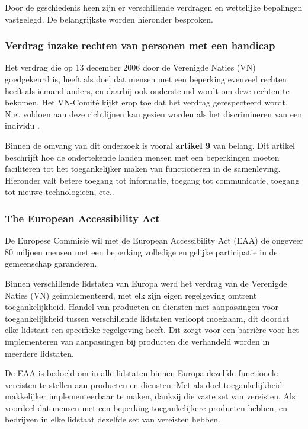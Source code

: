 Door de geschiedenis heen zijn er verschillende verdragen en wettelijke bepalingen vastgelegd. De belangrijkste worden hieronder besproken. 




\subsubsection{Verdrag inzake rechten van personen met een handicap}
Het verdrag die op 13 december 2006 door de Verenigde Naties (VN) goedgekeurd is, heeft als doel dat mensen met een beperking evenveel rechten heeft als iemand anders, en daarbij ook ondersteund wordt om deze rechten te bekomen.  Het VN-Comité kijkt erop toe dat het verdrag gerespecteerd wordt. Niet voldoen aan deze richtlijnen kan gezien worden als het discrimineren van een individu \autocite{unia2006}. 

Binnen de omvang van dit onderzoek is vooral  \textbf{artikel 9} van belang. Dit artikel beschrijft hoe de ondertekende landen mensen met een beperkingen moeten faciliteren tot het toegankelijker maken van functioneren in de samenleving. Hieronder valt betere toegang tot informatie, toegang tot communicatie, toegang tot nieuwe technologieën, etc.. \autocite{un2006}

\subsubsection{The European Accessibility Act}
De Europese Commisie wil met de European Accessibility Act (EAA) de ongeveer 80 miljoen mensen met een beperking volledige en gelijke participatie in de gemeenschap garanderen. 

Binnen verschillende lidstaten van Europa werd het verdrag van de Verenigde Naties (VN) geïmplementeerd, met elk zijn eigen regelgeving omtrent toegankelijkheid.
Handel van producten en diensten met aanpassingen voor toegankelijkheid tussen verschillende lidstaten verloopt moeizaam, dit doordat elke lidstaat een specifieke regelgeving heeft.
Dit zorgt voor een barrière voor het implementeren van aanpassingen bij producten die verhandeld worden in meerdere lidstaten.

De EAA is bedoeld om in alle lidstaten binnen Europa dezelfde functionele vereisten te stellen aan producten en diensten. Met als doel toegankelijkheid makkelijker implementeerbaar te maken, dankzij die vaste set van vereisten. 
Als voordeel dat mensen met een beperking toegankelijkere producten hebben, en bedrijven in elke lidstaat dezelfde set van vereisten hebben.

